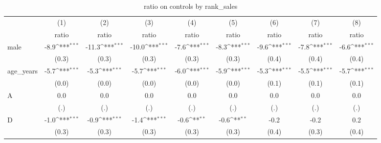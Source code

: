 \begin{table}[htbp]\centering
\def\sym#1{\ifmmode^{#1}\else\(^{#1}\)\fi}
\caption{ratio on controls by rank\_sales}
\begin{tabular}{l*{8}{c}}
\hline\hline
                    &\multicolumn{1}{c}{(1)}&\multicolumn{1}{c}{(2)}&\multicolumn{1}{c}{(3)}&\multicolumn{1}{c}{(4)}&\multicolumn{1}{c}{(5)}&\multicolumn{1}{c}{(6)}&\multicolumn{1}{c}{(7)}&\multicolumn{1}{c}{(8)}\\
                    &\multicolumn{1}{c}{ratio}&\multicolumn{1}{c}{ratio}&\multicolumn{1}{c}{ratio}&\multicolumn{1}{c}{ratio}&\multicolumn{1}{c}{ratio}&\multicolumn{1}{c}{ratio}&\multicolumn{1}{c}{ratio}&\multicolumn{1}{c}{ratio}\\
\hline
male                &        -8.9\sym{***}&       -11.3\sym{***}&       -10.0\sym{***}&        -7.6\sym{***}&        -8.3\sym{***}&        -9.6\sym{***}&        -7.8\sym{***}&        -6.6\sym{***}\\
                    &       (0.3)         &       (0.3)         &       (0.3)         &       (0.3)         &       (0.3)         &       (0.4)         &       (0.4)         &       (0.4)         \\
[1em]
age\_years           &        -5.7\sym{***}&        -5.3\sym{***}&        -5.7\sym{***}&        -6.0\sym{***}&        -5.9\sym{***}&        -5.3\sym{***}&        -5.5\sym{***}&        -5.7\sym{***}\\
                    &       (0.0)         &       (0.0)         &       (0.0)         &       (0.0)         &       (0.0)         &       (0.1)         &       (0.1)         &       (0.1)         \\
[1em]
A                   &         0.0         &         0.0         &         0.0         &         0.0         &         0.0         &         0.0         &         0.0         &         0.0         \\
                    &         (.)         &         (.)         &         (.)         &         (.)         &         (.)         &         (.)         &         (.)         &         (.)         \\
[1em]
D                   &        -1.0\sym{***}&        -0.9\sym{***}&        -1.4\sym{***}&        -0.6\sym{**} &        -0.6\sym{**} &        -0.2         &        -0.2         &         0.2         \\
                    &       (0.3)         &       (0.3)         &       (0.3)         &       (0.3)         &       (0.3)         &       (0.4)         &       (0.3)         &       (0.4)         \\

\end{tabular}
\end{table}
